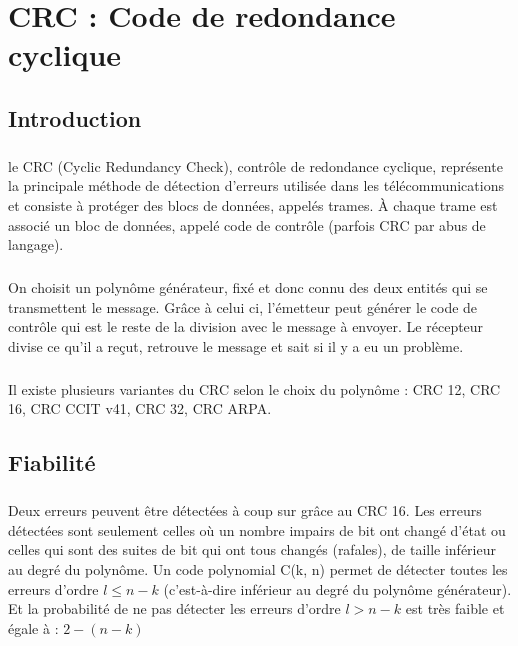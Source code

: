 
\chapter{CRC : Code de redondance cyclique}

    \section{Introduction}

        \paragraph{}
le CRC (Cyclic Redundancy Check), contrôle de redondance cyclique,
représente la principale méthode de détection d'erreurs utilisée dans les télécommunications et
consiste à protéger des blocs de données, appelés trames.
À chaque trame est associé un bloc de données, appelé code de contrôle (parfois CRC par abus de langage).
        \paragraph{}
On choisit un polynôme générateur, fixé et donc connu des deux entités qui se transmettent le message.
Grâce à celui ci, l'émetteur peut générer le code de contrôle qui est le reste de la division avec le message à envoyer.
Le récepteur divise ce qu'il a reçut, retrouve le message et sait si il y a eu un problème.
        \paragraph{}
Il existe plusieurs variantes du CRC selon le choix du polynôme : CRC 12, CRC 16, CRC CCIT v41, CRC 32, CRC ARPA.


    \section{Fiabilité}

        \paragraph{}
Deux erreurs peuvent être détectées à coup sur grâce au CRC 16.
Les erreurs détectées sont seulement celles où un nombre impairs de bit ont changé d'état ou
celles qui sont des suites de bit qui ont tous changés (rafales), de taille inférieur au
degré du polynôme.
Un code polynomial C(k, n) permet de détecter toutes les
erreurs d’ordre $l \leq n-k$ (c’est-à-dire inférieur au degré du
polynôme générateur).
Et la probabilité de ne pas détecter les erreurs d’ordre $l>n-k$ est
très faible et égale à : $2-(n-k)$


